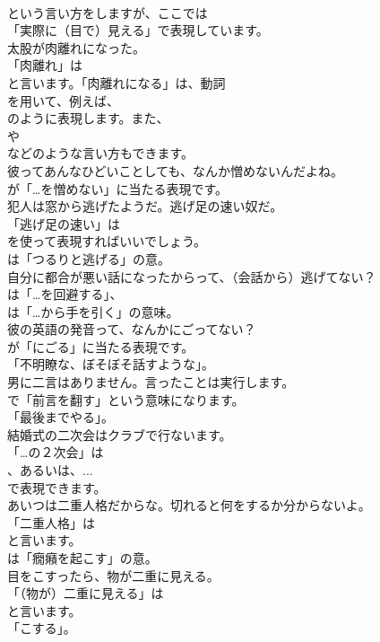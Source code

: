 \documentclass[8pt]{extreport}
\begin{document}
\begin{CJK}{UTF8}{min}
\\	という言い方をしますが、ここでは
\\	「実際に（目で）見える」で表現しています。	
\\	太股が肉離れになった。 
\\	「肉離れ」は
\\	と言います。「肉離れになる」は、動詞
\\	を用いて、例えば、
\\	のように表現します。また、
\\	や
\\	などのような言い方もできます。	
\\	彼ってあんなひどいことしても、なんか憎めないんだよね。 
\\	が「…を憎めない」に当たる表現です。	
\\	犯人は窓から逃げたようだ。逃げ足の速い奴だ。 
\\	「逃げ足の速い」は
\\	を使って表現すればいいでしょう。
\\	は「つるりと逃げる」の意。	
\\	自分に都合が悪い話になったからって、（会話から）逃げてない？ 
\\	は「…を回避する」、
\\	は「…から手を引く」の意味。	
\\	彼の英語の発音って、なんかにごってない？ 
\\	が「にごる」に当たる表現です。
\\	「不明瞭な、ぼそぼそ話すような」。	
\\	男に二言はありません。言ったことは実行します。 
\\	で「前言を翻す」という意味になります。
\\	「最後までやる」。	
\\	結婚式の二次会はクラブで行ないます。 
\\	「…の２次会」は
\\	、あるいは、... 
\\	で表現できます。	
\\	あいつは二重人格だからな。切れると何をするか分からないよ。 
\\	「二重人格」は
\\	と言います。
\\	は「癇癪を起こす」の意。	
\\	目をこすったら、物が二重に見える。 
\\	「（物が）二重に見える」は
\\	と言います。
\\	「こする」。	

\end{CJK}
\end{document}
